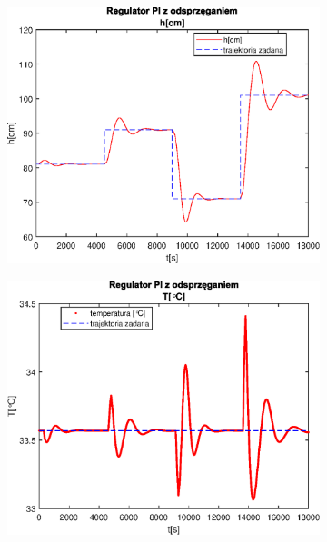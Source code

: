 \begin{figure}[h!]
   \centering
   \begin{subfigure}[b]{0.4\textwidth}
      \includegraphics[width=1\linewidth]{img/PI/decoupler/noDisturbance/PIDecouplerH2Linfalse.eps}
      \caption{}
      \label{fig:fig:PIDecoupler2Linfalse1}
   \end{subfigure}
       
   \begin{subfigure}[b]{0.4\textwidth}
      \includegraphics[width=1\linewidth]{img/PI/decoupler/noDisturbance/PIDecouplerT2Linfalse.eps}
      \caption{}
      \label{fig:fig:PIDecoupler2Linfalse2}
   \end{subfigure}
       

\end{figure}
